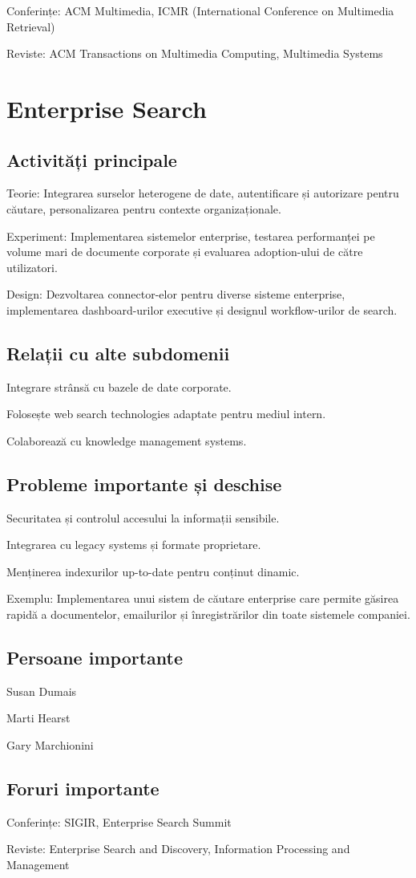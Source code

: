 \documentclass[12pt]{article}
\begin{document}
Conferințe: ACM Multimedia, ICMR (International Conference on Multimedia Retrieval)

Reviste: ACM Transactions on Multimedia Computing, Multimedia Systems

\section{Enterprise Search}

\subsection*{Activități principale}

Teorie: Integrarea surselor heterogene de date, autentificare și autorizare pentru căutare, personalizarea pentru contexte organizaționale.

Experiment: Implementarea sistemelor enterprise, testarea performanței pe volume mari de documente corporate și evaluarea adoption-ului de către utilizatori.

Design: Dezvoltarea connector-elor pentru diverse sisteme enterprise, implementarea dashboard-urilor executive și designul workflow-urilor de search.

\subsection*{Relații cu alte subdomenii}

Integrare strânsă cu bazele de date corporate.

Folosește web search technologies adaptate pentru mediul intern.

Colaborează cu knowledge management systems.

\subsection*{Probleme importante și deschise}

Securitatea și controlul accesului la informații sensibile.

Integrarea cu legacy systems și formate proprietare.

Menținerea indexurilor up-to-date pentru conținut dinamic.

Exemplu: Implementarea unui sistem de căutare enterprise care permite găsirea rapidă a documentelor, emailurilor și înregistrărilor din toate sistemele companiei.

\subsection*{Persoane importante}

Susan Dumais

Marti Hearst

Gary Marchionini

\subsection*{Foruri importante}

Conferințe: SIGIR, Enterprise Search Summit

Reviste: Enterprise Search and Discovery, Information Processing and Management
\end{document}
